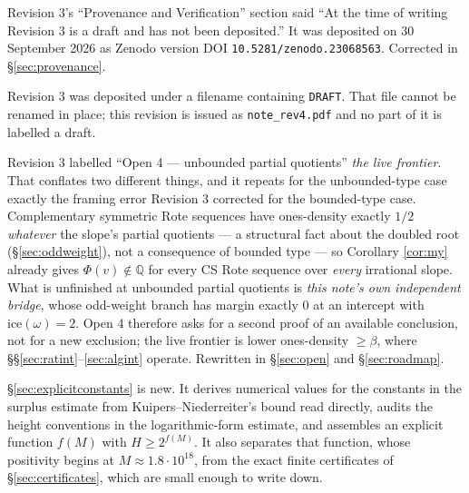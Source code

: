 \documentclass[11pt]{article}
\newcommand{\Q}{\mathbb{Q}}
\begin{document}
\begin{description}[leftmargin=2.5em,style=nextline]

\item[E1 --- Revision 3 is deposited.] Revision 3's ``Provenance and Verification'' section said
``At the time of writing Revision 3 is a draft and has not been deposited.'' It was deposited on
30 September 2026 as Zenodo version DOI \texttt{10.5281/zenodo.23068563}. Corrected in
\S\ref{sec:provenance}.

\item[E2 --- The ``draft'' labelling is removed.] Revision 3 was deposited under a filename
containing \texttt{DRAFT}. That file cannot be renamed in place; this revision is issued as
\texttt{note\_rev4.pdf} and no part of it is labelled a draft.

\item[E3 --- Open 4's framing is corrected.] Revision 3 labelled ``Open 4 --- unbounded partial
quotients'' \emph{the live frontier}. That conflates two different things, and it repeats for the
unbounded-type case exactly the framing error Revision 3 corrected for the bounded-type case.
Complementary symmetric Rote sequences have ones-density exactly $1/2$ \emph{whatever} the slope's
partial quotients --- a structural fact about the doubled root (\S\ref{sec:oddweight}), not a
consequence of bounded type --- so Corollary \ref{cor:my} already gives $\Phi(v)\notin\Q$ for every
CS Rote sequence over \emph{every} irrational slope. What is unfinished at unbounded partial
quotients is \emph{this note's own independent bridge}, whose odd-weight branch has margin exactly
$0$ at an intercept with $\text{ice}(\omega)=2$. Open 4 therefore asks for a second proof of an
available conclusion, not for a new exclusion; the live frontier is lower ones-density $\ge\beta$,
where \S\S\ref{sec:ratint}--\ref{sec:algint} operate. Rewritten in \S\ref{sec:open} and
\S\ref{sec:roadmap}.

\item[E4 --- Explicit constants added.] \S\ref{sec:explicitconstants} is new. It derives numerical
values for the constants in the surplus estimate from Kuipers--Niederreiter's bound read directly,
audits the height conventions in the logarithmic-form estimate, and assembles an explicit function
$f(M)$ with $H\ge2^{f(M)}$. It also separates that function, whose positivity begins at
$M\approx1.8\cdot10^{18}$, from the exact finite certificates of \S\ref{sec:certificates}, which are
small enough to write down.

\end{description}
\end{document}

